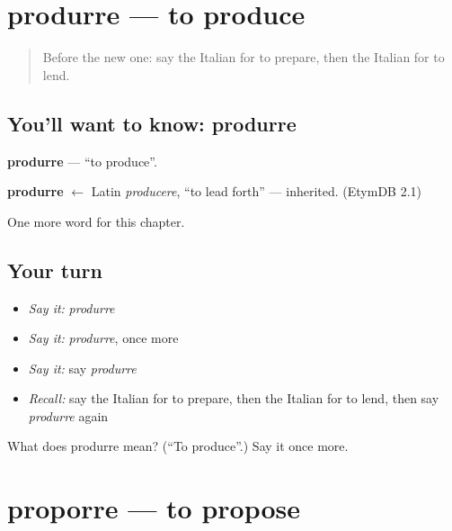 \section[produrre]{produrre — to produce}

\label{lesson:IT-C210-produrre}



\begin{quote}
Before the new one: say the Italian for to prepare, then the Italian for to lend.
\end{quote}

\subsection*{You'll want to know: produrre}
\textbf{produrre} — \textquotedblleft{}to produce\textquotedblright{}.

\begin{cousinweb}
\textbf{produrre} $\leftarrow$ Latin \emph{producere}, \textquotedblleft{}to lead forth\textquotedblright{} — inherited. (EtymDB 2.1)
\end{cousinweb}

\begin{grammarlens}[title={What you've built}]
One more word for this chapter.
\end{grammarlens}

\subsection*{Your turn}
\begin{itemize}
\raggedright
  \item \emph{Say it:} \emph{produrre}
  \item \emph{Say it:} \emph{produrre}, once more
  \item \emph{Say it:} say \emph{produrre}
  \item \emph{Recall:} say the Italian for to prepare, then the Italian for to lend, then say \emph{produrre} again
\end{itemize}

\begin{tcolorbox}[breakable,colback=teal!4,colframe=teal!35!black,title={Before you move on}]
What does produrre mean? (\textquotedblleft{}To produce\textquotedblright{}.) Say it once more.
\end{tcolorbox}
\section[proporre]{proporre — to propose}

